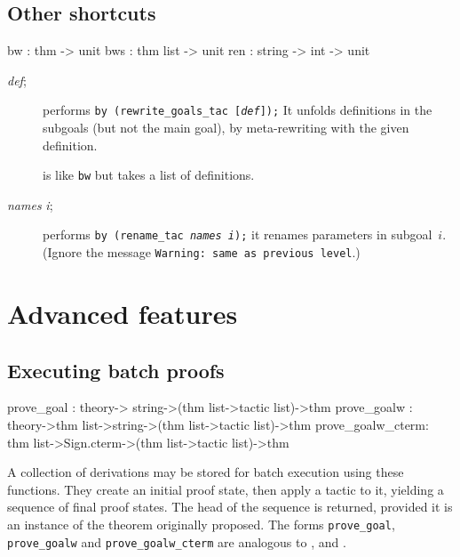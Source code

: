 \subsection{Other shortcuts}
\begin{ttbox} 
bw  : thm -> unit
bws : thm list -> unit
ren : string -> int -> unit
\end{ttbox}
\begin{description}
\item[ {\it def};] 
performs \hbox{\tt by (rewrite_goals_tac [{\it def}]);}
It unfolds definitions in the subgoals (but not the main goal), by
meta-rewriting with the given definition.

\item[] 
is like {\tt bw} but takes a list of definitions.

\item[ {\it names} {\it i};] 
performs \hbox{\tt by (rename_tac {\it names} {\it i});} it renames
parameters in subgoal~$i$.  (Ignore the message {\tt Warning:\ same as
previous level}.)
\end{description}



\section{Advanced features}
\subsection{Executing batch proofs}
\begin{ttbox} 
prove_goal  :  theory->          string->(thm list->tactic list)->thm
prove_goalw :  theory->thm list->string->(thm list->tactic list)->thm
prove_goalw_cterm: thm list->Sign.cterm->(thm list->tactic list)->thm
\end{ttbox}
A collection of derivations may be stored for batch execution using these
functions.  They create an initial proof state, then apply a tactic to it,
yielding a sequence of final proof states.  The head of the sequence is
returned, provided it is an instance of the theorem originally proposed.
The forms {\tt prove_goal}, {\tt prove_goalw} and {\tt prove_goalw_cterm}
are analogous to ,  and .

